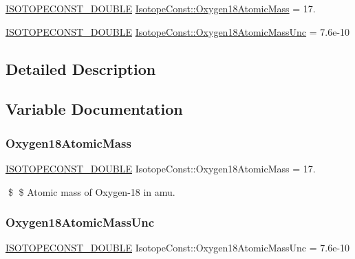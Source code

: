 \begin{DoxyCompactItemize}
\item 
\mbox{\hyperlink{group___isotope_const-_macros_ga8f45a7272ce02c0b4c65c44636ed719a}{I\+S\+O\+T\+O\+P\+E\+C\+O\+N\+S\+T\+\_\+\+D\+O\+U\+B\+LE}} \mbox{\hyperlink{group___isotope_const-_oxygen-_o18_ga4d824361ed64d5cc4a73ec13a0f8cc60}{Isotope\+Const\+::\+Oxygen18\+Atomic\+Mass}} = 17.
\item 
\mbox{\hyperlink{group___isotope_const-_macros_ga8f45a7272ce02c0b4c65c44636ed719a}{I\+S\+O\+T\+O\+P\+E\+C\+O\+N\+S\+T\+\_\+\+D\+O\+U\+B\+LE}} \mbox{\hyperlink{group___isotope_const-_oxygen-_o18_gaaac43e9ef80bb41043e419de10552983}{Isotope\+Const\+::\+Oxygen18\+Atomic\+Mass\+Unc}} = 7.\+6e-\/10
\end{DoxyCompactItemize}


\subsection{Detailed Description}


\subsection{Variable Documentation}
\mbox{\label{group___isotope_const-_oxygen-_o18_ga4d824361ed64d5cc4a73ec13a0f8cc60}} 
\subsubsection{\texorpdfstring{Oxygen18\+Atomic\+Mass}{Oxygen18AtomicMass}}
{\footnotesize\ttfamily \mbox{\hyperlink{group___isotope_const-_macros_ga8f45a7272ce02c0b4c65c44636ed719a}{I\+S\+O\+T\+O\+P\+E\+C\+O\+N\+S\+T\+\_\+\+D\+O\+U\+B\+LE}} Isotope\+Const\+::\+Oxygen18\+Atomic\+Mass = 17.}

\$ \$ Atomic mass of Oxygen-\/18 in amu. \mbox{\label{group___isotope_const-_oxygen-_o18_gaaac43e9ef80bb41043e419de10552983}} 
\subsubsection{\texorpdfstring{Oxygen18\+Atomic\+Mass\+Unc}{Oxygen18AtomicMassUnc}}
{\footnotesize\ttfamily \mbox{\hyperlink{group___isotope_const-_macros_ga8f45a7272ce02c0b4c65c44636ed719a}{I\+S\+O\+T\+O\+P\+E\+C\+O\+N\+S\+T\+\_\+\+D\+O\+U\+B\+LE}} Isotope\+Const\+::\+Oxygen18\+Atomic\+Mass\+Unc = 7.\+6e-\/10}

